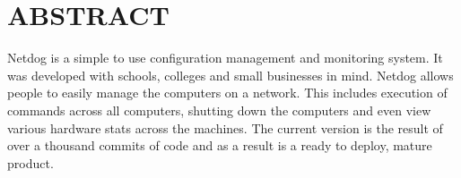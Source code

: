 \chapter*{\rm \large \bf ABSTRACT}
\vspace{4.0mm}
\setlength{\parindent}{4em}

\par
Netdog is a simple to use configuration management and monitoring system. It was
developed with schools, colleges and small businesses in mind. Netdog allows
people to easily manage the computers on a network. This includes execution of
commands across all computers, shutting down the computers and even view various
hardware stats across the machines. The current version is the result of over
a thousand commits of code and as a result is a ready to deploy, mature product.
\newpage 
